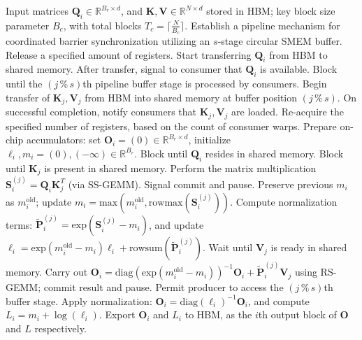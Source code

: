 \begin{algorithm}[H]
    \caption{\small\label{alg:flash3_wgmma_ws_only}\textsc{FlashAttention-3} forward pass \textbf{excluding} intra-consumer overlap -- CTA perspective}
    \begin{algorithmic}[1]
\REQUIRE Input matrices $\mathbf{Q}_i \in \mathbb{R}^{B_r \times d}$, and $\mathbf{K}, \mathbf{V} \in \mathbb{R}^{N \times d}$ stored in HBM; key block size parameter $B_c$, with total blocks $T_c = \lceil \frac{N}{B_c} \rceil$.
\STATE Establish a pipeline mechanism for coordinated barrier synchronization utilizing an $s$-stage circular SMEM buffer.
\STATE Release a specified amount of registers.
\STATE Start transferring $\mathbf{Q}_i$ from HBM to shared memory.
\STATE After transfer, signal to consumer that $\mathbf{Q}_i$ is available.
    \STATE Block until the $(j\,\%\,s)$th pipeline buffer stage is processed by consumers.
    \STATE Begin transfer of $\mathbf{K}_j, \mathbf{V}_j$ from HBM into shared memory at buffer position $(j\,\%\,s)$.
    \STATE On successful completion, notify consumers that $\mathbf{K}_j, \mathbf{V}_j$ are loaded.
\ENDFOR
\ELSE \STATE Re-acquire the specified number of registers, based on the count of consumer warps.
\STATE Prepare on-chip accumulators: set $\mathbf{O}_i = (0) \in \mathbb{R}^{B_r \times d}$, initialize $\ell_i, m_i = (0), (-\infty) \in \mathbb{R}^{B_r}$.
\STATE Block until $\mathbf{Q}_i$ resides in shared memory.
\STATE Block until $\mathbf{K}_j$ is present in shared memory.
\STATE Perform the matrix multiplication $\mathbf{S}_i^{(j)} = \mathbf{Q}_i \mathbf{K}_j^T$ (via SS-GEMM). Signal commit and pause. \label{alg:ws_only_gemm1}
\STATE Preserve previous $m_i$ as $m_i^{\mathrm{old}}$; update $m_i = \mathrm{max}(m_i^{\mathrm{old}}, \mathrm{rowmax}(\mathbf{S}_i^{(j)}))$. \label{code-ws:softmax_start}
\STATE Compute normalization terms: $\widetilde{\mathbf{P}}_i^{(j)} = \mathrm{exp}(\mathbf{S}_i^{(j)} - m_i)$, and update $\ell_i = \mathrm{exp}(m_i^{\mathrm{old}} - m_i) \ell_i + \mathrm{rowsum}(\widetilde{\mathbf{P}}_i^{(j)})$. \label{code-ws:softmax_end}
\STATE Wait until $\mathbf{V}_j$ is ready in shared memory.
\STATE Carry out $\mathbf{O}_i = \mathrm{diag}(\mathrm{exp}(m_i^{\mathrm{old}} - m_i))^{-1} \mathbf{O}_i + \widetilde{\mathbf{P}}_i^{(j)} \mathbf{V}_j$ using RS-GEMM; commit result and pause. \label{alg:ws_only_gemm2}
\STATE Permit producer to access the $(j\,\%\,s)$th buffer stage.
\ENDFOR
\STATE Apply normalization: $\mathbf{O}_i = \mathrm{diag}(\ell_i)^{-1} \mathbf{O}_i$, and compute $L_i = m_i + \log(\ell_i)$.
\STATE Export $\mathbf{O}_i$ and $L_i$ to HBM, as the $i$th output block of $\mathbf{O}$ and $L$ respectively.
\ENDIF
\end{algorithmic}
\end{algorithm}

